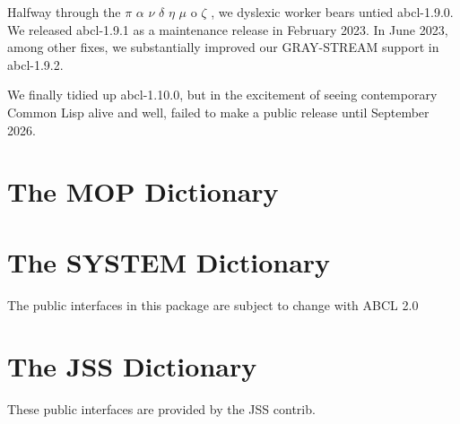 \documentclass[10pt]{book}
\begin{document}
Halfway through the $\pi$ $\alpha$ $\nu$ $\delta$ $\eta$ $\mu$ o
$\zeta$ \cite{pandemos}, we dyslexic worker bears untied abcl-1.9.0.
We released abcl-1.9.1 as a maintenance release in February 2023.  In
June 2023, among other fixes, we substantially improved our
GRAY-STREAM support in abcl-1.9.2.

We finally tidied up abcl-1.10.0, but in the excitement of seeing
contemporary Common Lisp alive and well, failed to make a public
release until September 2026.  

\appendix 

\chapter{The MOP Dictionary}



\chapter{The SYSTEM Dictionary}

The public interfaces in this package are subject to change with
\textsc{ABCL} 2.0



\chapter{The JSS Dictionary}

These public interfaces are provided by the JSS contrib.






\printindex
\end{document}

